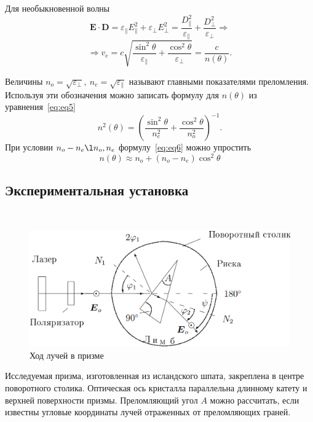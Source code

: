 \documentclass[12pt]{article}
\renewcommand{\vec}{\textbf}
\begin{document}
    Для необыкновенной волны
    \begin{equation*}
        \vec{E}\cdot\vec{D} = \varepsilon_{\parallel} E_{\parallel}^2 + \varepsilon_{\perp} E_{\perp}^2 =
        \frac{D_{\parallel}^2}{\varepsilon_{\parallel}} +  \frac{D_{\perp}^2}{\varepsilon_{\perp}} \Rightarrow
    \end{equation*}
    \begin{equation}
        \label{eq:eq5}
        \Rightarrow
        v_e = c\sqrt{\frac{\sin^2{\theta}}{\varepsilon_{\parallel}} + \frac{\cos^2{\theta}}{\varepsilon_{\perp}}} =
        \frac{c}{n(\theta)}.
    \end{equation}

    Величины $n_o = \sqrt{\varepsilon_{\perp}},\ n_e = \sqrt{\varepsilon_{\parallel}}$
    называют главными показателями преломления.
    Используя эти обозначения можно записать формулу для $n(\theta)$ из уравнения\ \eqref{eq:eq5}
    \begin{equation}
        \label{eq:eq6}
        n^2(\theta) = \left(\frac{\sin^2{\theta}}{n_e^2} +
        \frac{\cos^2{\theta}}{n_o^2}\right)^{-1}.
    \end{equation}
    При условии $n_o - n_e \l n_o, n_e$ формулу\ \eqref{eq:eq6} можно упростить
    \begin{equation}
        \label{eq:eq7}
        n(\theta) \approx n_o + (n_o - n_e)\cos^2{\theta}
    \end{equation}

    \subsection*{Экспериментальная установка}
    \ \par
    \begin{figure}
        \label{fig:fig2}
        \centering
        \includegraphics[width=\linewidth]{pic/setup}
        \caption{Ход лучей в призме}
    \end{figure}
    Исследуемая призма, изготовленная из исландского шпата, закреплена в центре поворотного столика.
    Оптическая ось кристалла параллельна длинному катету и верхней поверхности призмы.
    Преломляющий угол $A$ можно рассчитать, если известны угловые координаты лучей отраженных от
    преломляющих граней.
\end{document}
